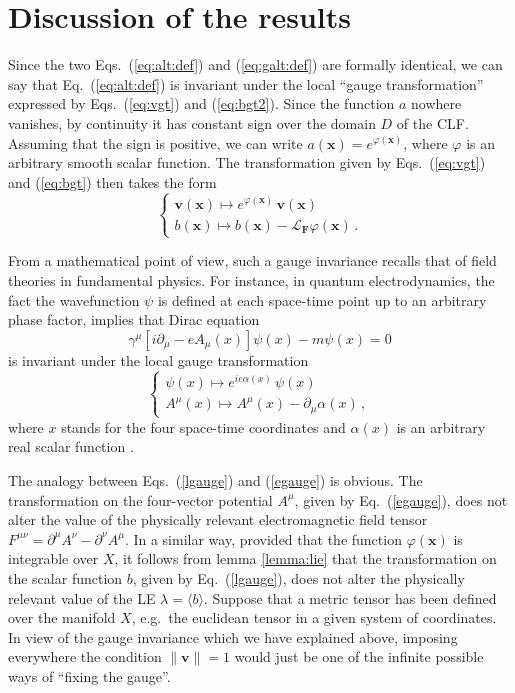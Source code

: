 \documentclass{article}
\theoremstyle{plain}
\theoremstyle{definition}
\theoremstyle{remark}
\newcommand{\vect}[1]{\boldsymbol{#1}}
\begin{document}
\section{Discussion of the results}\label{sec:gauge}

Since the two Eqs.~(\ref{eq:alt:def}) and (\ref{eq:galt:def}) are
formally identical, we can say that Eq.~(\ref{eq:alt:def}) is
invariant under the local ``gauge transformation'' expressed by
Eqs.~(\ref{eq:vgt}) and (\ref{eq:bgt2}).
Since the function $a$ nowhere vanishes, 
by continuity it has constant sign over the
domain $D$ of the CLF. Assuming that the sign is positive, we can
write $a(\vect{x})=e^{\varphi(\vect{x})}$, where $\varphi$ is an arbitrary
smooth scalar function. The transformation
given by Eqs.~(\ref{eq:vgt}) and (\ref{eq:bgt}) then takes the form
\begin{equation}\label{lgauge}
  \left\{\begin{array}{l}
  \vect{v}(\vect{x})  \mapsto  e^{\varphi(\vect{x})}\, \vect{v}(\vect{x}) \\
  b(\vect{x})  \mapsto b(\vect{x}) - \mathcal{L}_{\vect{F}}
  \varphi(\vect{x})  \, .
  \end{array}\right.
\end{equation}

From a mathematical point of view, such a gauge invariance recalls
that of field theories in fundamental physics. For instance, in
quantum electrodynamics, the fact the wavefunction $\psi$ is defined
at each space-time point up to an arbitrary phase factor, implies that
Dirac equation
\[
\gamma^\mu\left[i\partial_\mu-eA_\mu(x)\right]\psi(x)-m\psi(x)=0
\]
is invariant under the local gauge transformation
\begin{equation}\label{egauge}
\left\{\begin{array}{l}
  \psi(x)  \mapsto  e^{ie\alpha(x)}\, \psi(x) \\
  A^\mu(x)  \mapsto A^\mu(x) -\partial_\mu \alpha(x)
  \, ,
  \end{array}\right.
\end{equation}
where $x$ stands for the four space-time coordinates and $\alpha(x)$
is an arbitrary real scalar function \cite{zuber}.
 
The analogy between Eqs.~(\ref{lgauge}) and (\ref{egauge}) is obvious.
The transformation on the four-vector potential $A^\mu$, given by
Eq.~(\ref{egauge}), does not alter the value of the physically
relevant electromagnetic field tensor $F^{\mu\nu}=\partial^{\mu}A^\nu
-\partial^{\nu}A^\mu$. In a similar way, provided that the function
$\varphi(\vect{x})$ is integrable over $X$, it follows from
lemma \ref{lemma:lie} that
the transformation on the
scalar function $b$, given by Eq.~(\ref{lgauge}), does not alter the
physically relevant value of the LE $\lambda= \langle b\rangle$.
Suppose that a metric tensor has been defined over the manifold $X$, 
e.g.\ the euclidean tensor in a given system of coordinates.
In view of the gauge invariance which we have explained above, imposing
everywhere the condition $\lVert\vect{v}\rVert=1$ would just be
one of the infinite possible ways of ``fixing the gauge''.
\end{document}
